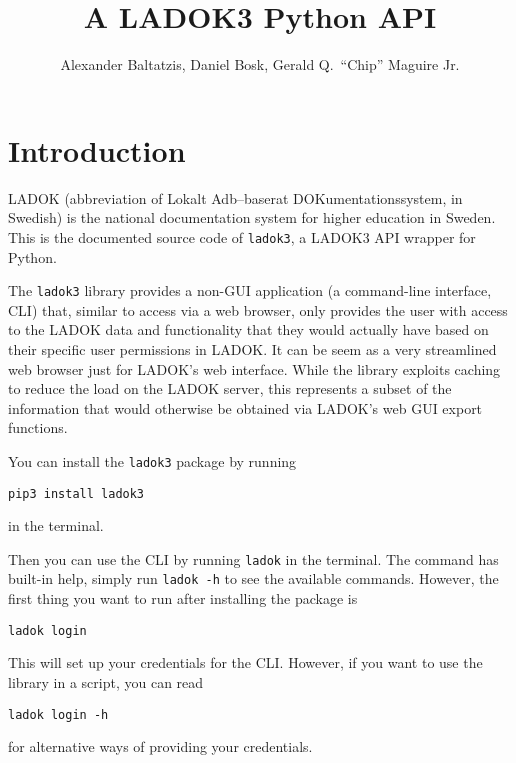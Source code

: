 \documentclass[a4paper,oneside]{memoir}
\title{%
  A LADOK3 Python API
}
\author{%
  Alexander Baltatzis,
  Daniel Bosk,
  Gerald Q.\ \enquote{Chip} Maguire Jr.
}
\affil{%
  KTH EECS\\
  \texttt{\{alba,dbosk,maguire\}@kth.se}
}
\begin{document}
\frontmatter
\maketitle

\vspace*{\fill}
\clearpage

\begin{abstract}
  
\end{abstract}
\clearpage

\tableofcontents*
\clearpage

\mainmatter
\chapter{Introduction}

LADOK (abbreviation of \foreignlanguage{swedish}{Lokalt Adb–baserat 
DOKumentationssystem}, in Swedish) is the national documentation system for 
higher education in Sweden.
This is the documented source code of \texttt{ladok3}, a LADOK3 API wrapper for 
Python.

The \texttt{ladok3} library provides a non-GUI application (a command-line 
interface, CLI) that, similar to access via a web browser, only provides the 
user with access to the LADOK data and functionality that they would actually 
have based on their specific user permissions in LADOK.
It can be seem as a very streamlined web browser just for LADOK's web 
interface.
While the library exploits caching to reduce the load on the LADOK server, this 
represents a subset of the information that would otherwise be obtained via
LADOK's web GUI export functions.

You can install the \texttt{ladok3} package by running
\begin{verbatim}
pip3 install ladok3
\end{verbatim}
in the terminal.

Then you can use the CLI by running \texttt{ladok} in the terminal.
The command has built-in help, simply run \texttt{ladok -h} to see 
the available commands.
However, the first thing you want to run after installing the package is
\begin{verbatim}
ladok login
\end{verbatim}
This will set up your credentials for the CLI.
However, if you want to use the library in a script, you can read
\begin{verbatim}
ladok login -h
\end{verbatim}
for alternative ways of providing your credentials.
\end{document}
